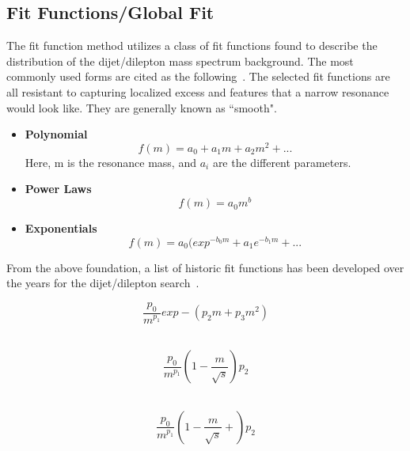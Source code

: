 \subsection{Fit Functions/Global Fit}
\label{sec:fitfunction}
    The fit function method utilizes a class of fit functions found to describe the distribution of the dijet/dilepton mass spectrum background. The most commonly used forms are cited as the following~\cite{ATL-PHYS-PUB-2020-028}. The selected fit functions are all resistant to capturing localized excess and features that a narrow resonance would look like. They are generally known as ``smooth".

    \begin{itemize}

    \item \textbf{Polynomial}
        \begin{equation}
            f(m)= a_0 + a_{1}m + a_{2}m^{2}+...
        \end{equation} Here, m is the resonance mass, and $a_{i}$ are the different parameters.
    \item \textbf{Power Laws}
        \begin{equation}
            f(m)= a_{0}m^{b}
        \end{equation}

    \item \textbf{Exponentials}
        \begin{equation}
            f(m) = a_{0}(exp^{-b_{0}m} +a_{1}e^{-b_{1}m}+...
        \end{equation}

    \end{itemize}

From the above foundation, a list of historic fit functions has been developed over the years for the dijet/dilepton search~\cite{Pachal:2063032}.

    \begin{equation}
        \frac{p_{0}}{m^{p_{1}}}exp-(p_{2}m+p_{3}m^{2})
    \end{equation}~\cite{UA2:1990gao}

    \begin{equation}
        \frac{p_{0}}{m^{p_{1}}}(1-\frac{m}{\sqrt{s}})p_{2}
    \end{equation}~\cite{1995}

    \begin{equation}
        \frac{p_{0}}{m^{p_{1}}}(1-\frac{m}{\sqrt{s}}+)p_{2}
    \end{equation}~\cite{b582dc2d9c234174bfe2adbc9729bf42}

